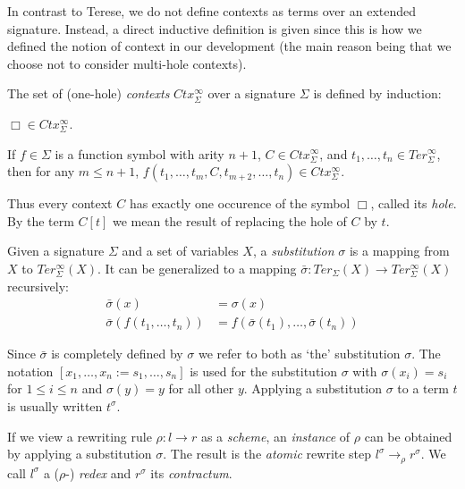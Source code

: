 In contrast to Terese, we do not define contexts as terms over an extended
signature. Instead, a direct inductive definition is given since this is how
we defined the notion of context in our \Coq development (the main reason being
that we choose not to consider multi-hole contexts).

\begin{definition}[Context]
The set of (one-hole) \emph{contexts} $Ctx_\Sigma^\infty$ over a signature
$\Sigma$ is defined by induction:
\begin{compactenum}
  \item
    $\Box \in Ctx_\Sigma^\infty$.
  \item
    If $f \in \Sigma$ is a function symbol with arity $n + 1$, $C \in
    Ctx_\Sigma^\infty$, and $t_1, \ldots, t_n \in Ter_\Sigma^\infty$, then for
    any $m \leq n + 1$, $f(t_1, \ldots, t_m, C, t_{m+2}, \ldots, t_{n}) \in
    Ctx_\Sigma^\infty$.
\end{compactenum}
\end{definition}

Thus every context $C$ has exactly one occurence of the symbol $\Box$, called
its \emph{hole}. By the term $C[t]$ we mean the result of replacing the hole
of $C$ by $t$.

\begin{definition}[Substitution]
Given a signature $\Sigma$ and a set of variables $X$, a \emph{substitution}
$\sigma$ is a mapping from $X$ to $Ter_\Sigma^\infty(X)$. It can be
generalized to a mapping $\bar{\sigma} : Ter_\Sigma(X) \rightarrow
Ter_\Sigma^\infty(X)$ recursively:
\begin{align*}
  \bar{\sigma}(x) &= \sigma(x)\\
  \bar{\sigma}(f(t_1, \ldots, t_n)) &= f(\bar{\sigma}(t_1), \ldots,
  \bar{\sigma}(t_n))
\end{align*}
\end{definition}

Since $\bar{\sigma}$ is completely defined by $\sigma$ we refer to both as
`the' substitution $\sigma$. The notation $[x_1, \ldots, x_n := s_1, \ldots,
  s_n]$ is used for the substitution $\sigma$ with $\sigma(x_i) = s_i$ for $1
\leq i \leq n$ and $\sigma(y) = y$ for all other $y$. Applying a substitution
$\sigma$ to a term $t$ is usually written $t^\sigma$.

If we view a rewriting rule $\rho : l \rightarrow r$ as a \emph{scheme}, an
\emph{instance} of $\rho$ can be obtained by applying a substitution
$\sigma$. The result is the \emph{atomic} rewrite step $l^\sigma
\rightarrow_\rho r^\sigma$. We call $l^\sigma$ a ($\rho$-) \emph{redex} and
$r^\sigma$ its \emph{contractum}.

